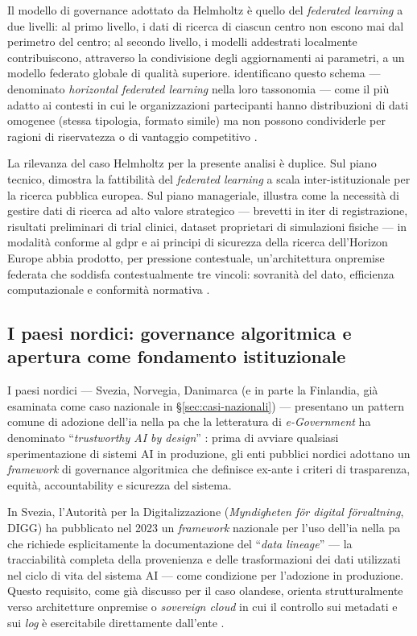 Il modello di governance adottato da Helmholtz è quello del
\textit{federated learning} a due livelli: al primo livello, i dati
di ricerca di ciascun centro non escono mai dal perimetro del centro;
al secondo livello, i modelli addestrati localmente contribuiscono, attraverso
la condivisione degli aggiornamenti ai parametri, a un modello federato globale
di qualità superiore. \textcite{GadekalluFL2026} identificano questo schema ---
denominato \textit{horizontal federated learning} nella loro tassonomia ---
come il più adatto ai contesti in cui le organizzazioni partecipanti hanno
distribuzioni di dati omogenee (stessa tipologia, formato simile) ma non
possono condividerle per ragioni di riservatezza o di vantaggio competitivo
\parencite{Banabilah2022FLReview}.

La rilevanza del caso Helmholtz per la presente analisi è duplice. Sul piano
tecnico, dimostra la fattibilità del \textit{federated learning} a scala
inter-istituzionale per la ricerca pubblica europea. Sul piano manageriale,
illustra come la necessità di gestire dati di ricerca ad alto valore strategico
--- brevetti in iter di registrazione, risultati preliminari di trial clinici,
dataset proprietari di simulazioni fisiche --- in modalità conforme al \gls{gdpr} e
ai principi di sicurezza della ricerca dell'Horizon Europe abbia prodotto,
per pressione contestuale, un'architettura \gls{onpremise} federata
che soddisfa contestualmente tre vincoli: sovranità del dato, efficienza
computazionale e conformità normativa \parencite{LiLaiWang2023}.

\subsection{I paesi nordici: governance algoritmica e apertura come fondamento
istituzionale}

I paesi nordici --- Svezia, Norvegia, Danimarca (e in parte la Finlandia, già
esaminata come caso nazionale in §\ref{sec:casi-nazionali}) --- presentano un
pattern comune di adozione dell'\gls{ia} nella \gls{pa} che la letteratura di
\textit{e-Government} ha denominato ``\textit{trustworthy AI by design}''
\parencite{OECDGoverningAI2025}: prima di avviare qualsiasi sperimentazione
di sistemi AI in produzione, gli enti pubblici nordici adottano un
\textit{framework} di governance algoritmica che definisce ex-ante i criteri
di trasparenza, equità, accountability e sicurezza del sistema.

In Svezia, l'Autorità per la Digitalizzazione (\textit{Myndigheten
för digital förvaltning}, DIGG) ha pubblicato nel 2023 un \textit{framework}
nazionale per l'uso dell'\gls{ia} nella \gls{pa} che richiede esplicitamente la
documentazione del ``\textit{data lineage}'' --- la tracciabilità completa
della provenienza e delle trasformazioni dei dati utilizzati nel ciclo di vita
del sistema AI --- come condizione per l'adozione in produzione. Questo requisito,
come già discusso per il caso olandese, orienta strutturalmente verso architetture
\gls{onpremise} o \textit{sovereign cloud} in cui il controllo sui metadati
e sui \textit{log} è esercitabile direttamente dall'ente \parencite{SvardGuerrero2024}.


